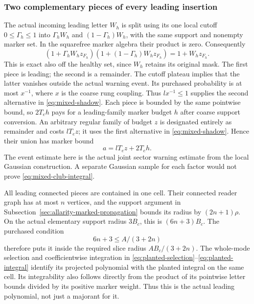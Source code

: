 \subsubsection{Two complementary pieces of every leading insertion}

The actual incoming leading letter $W_h$ is split using its one local
cutoff $0\le\Gamma_h\le1$ into $\Gamma_hW_h$ and
$(1-\Gamma_h)W_h$, with the same support and nonempty marker set.
In the squarefree marker algebra their product is zero. Consequently
\[
 (1+\Gamma_hW_hz_{F_h})(1+(1-\Gamma_h)W_hz_{F_h})
                           =1+W_hz_{F_h}.
\]
This is exact also off the healthy set, since $W_h$ retains its original
mask. The first piece is leading; the second is a remainder. The cutoff
plateau implies that the latter vanishes outside the actual warning
event. Its purchased probability is at most $x^{-1}$, where $x$ is
the coarse rung coupling. Thus $l x^{-1}\le1$ supplies the second
alternative in \eqref{eq:mixed-shadow}. Each piece is bounded by the
same pointwise bound, so $2T_eh$ pays for a leading-family marker budget
$h$ after coarse support conversion. An arbitrary regular family
of budget $z$ is designated entirely as remainder and costs $lT_ez$;
it uses the first alternative in \eqref{eq:mixed-shadow}.
Hence their union has marker bound
\begin{equation}\label{eq:mixed-day-marker}
                    a=lT_ez+2T_eh.
\end{equation}
The event estimate here is the actual joint sector warning estimate
from the local Gaussian construction. A separate Gaussian sample for
each factor would not prove \eqref{eq:mixed-club-integral}.

All leading connected pieces are contained in one cell. Their connected
reader graph has at most $n$ vertices, and the support argument in
Subsection~\ref{sec:allarity-marked-propagation} bounds its radius by
$(2n+1)\rho$. On the actual elementary support radius $3B_c$, this
is $(6n+3)B_c$. The purchased condition
\[
              6n+3\le A/(3+2n)
\]
therefore puts it inside the required slice radius $AB_c/(3+2n)$.
The whole-mode selection and coefficientwise integration in
\eqref{eq:planted-selection}--\eqref{eq:planted-integral} identify its
projected polynomial with the planted integral on the same cell.
Its integrability also follows directly from the product of its
pointwise letter bounds divided by its positive marker weight. Thus
this is the actual leading polynomial, not just a majorant for it.

